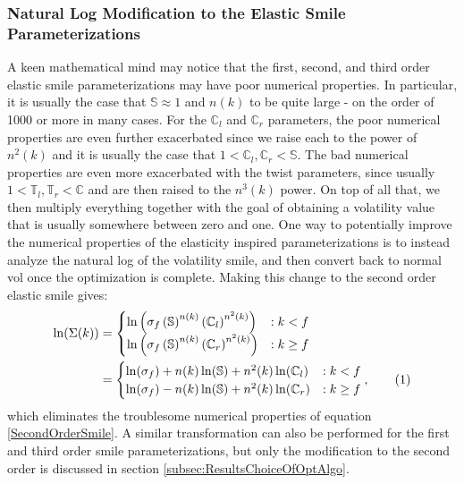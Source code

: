 \documentclass[12pt, a4paper, notitlepage]{article}
\numberwithin{equation}{subsection}
\numberwithin{figure}{subsection}
\numberwithin{table}{subsection}
\newcommand\numberthis{\addtocounter{equation}{1}\tag{\theequation}}
\newcommand{\newpar}{\newline \newline}
\begin{document}
\subsubsection{Natural Log Modification to the Elastic Smile Parameterizations}
A keen mathematical mind may notice that the first, second, and third order elastic smile parameterizations may have poor numerical properties.  In particular, it is usually the case that $\mathbb{S} \approx 1$ and $n(k)$ to be quite large - on the order of 1000 or more in many cases.  For the $\mathbb{C}_l$ and $\mathbb{C}_r$ parameters, the poor numerical properties are even further exacerbated since we raise each to the power of $n^{2}(k)$ and it is usually the case that $1 < \mathbb{C}_l,\mathbb{C}_r < \mathbb{S}$.  The bad numerical properties are even more exacerbated with the twist parameters, since usually $1 < \mathbb{T}_l,\mathbb{T}_r < \mathbb{C}$ and are then raised to the $n^{3}(k)$ power.  On top of all that, we then multiply everything together with the goal of obtaining a volatility value that is usually somewhere between zero and one.
\newpar
One way to potentially improve the numerical properties of the elasticity inspired parameterizations is to instead analyze the natural log of the volatility smile, and then convert back to normal vol once the optimization is complete.  Making this change to the second order elastic smile gives:
\begin{align*}
\ln(\Sigma(k)) 
&= 		\begin{cases}
			\ln\left(\sigma_f\left(\mathbb{S}\right)^{n(k)}\left(\mathbb{C}_l\right)^{n^{2}(k)}\right) & : k < f	\\
            \ln\left(\sigma_f\left(\mathbb{S}\right)^{n(k)}\left(\mathbb{C}_r\right)^{n^{2}(k)}\right) & : k \geq f	\\
        \end{cases} \\
&=		\begin{cases}
			\ln(\sigma_f) + n(k)\ln(\mathbb{S}) + n^{2}(k)\ln(\mathbb{C}_l) & : k < f	\\	
            \ln(\sigma_f) - n(k)\ln(\mathbb{S}) + n^{2}(k)\ln(\mathbb{C}_r) & : k \geq f	\\
        \end{cases}, \numberthis
\end{align*}
\label{SecondOrderSmileNaturalLog}
\newline
which eliminates the troublesome numerical properties of equation \ref{SecondOrderSmile}.  A similar transformation can also be performed for the first and third order smile parameterizations, but only the modification to the second order is discussed in section \ref{subsec:ResultsChoiceOfOptAlgo}.
\end{document}
